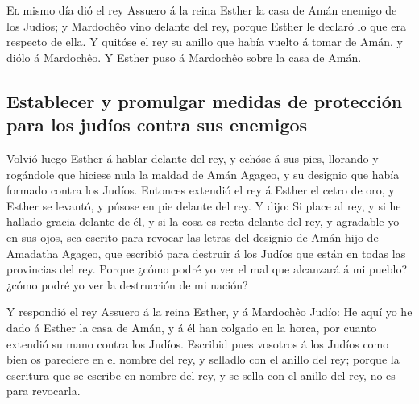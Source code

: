  \textsc{El} mismo día dió el rey Assuero á la reina
Esther la casa de Amán enemigo de los Judíos; y Mardochêo vino delante
del rey, porque Esther le declaró lo que era respecto de ella.
 Y quitóse el rey su anillo que había vuelto á tomar de
Amán, y diólo á Mardochêo. Y Esther puso á Mardochêo sobre la casa de
Amán.

\hypertarget{establecer-y-promulgar-medidas-de-protecciuxf3n-para-los-juduxedos-contra-sus-enemigos}{%
\subsection{Establecer y promulgar medidas de protección para los judíos
contra sus
enemigos}\label{establecer-y-promulgar-medidas-de-protecciuxf3n-para-los-juduxedos-contra-sus-enemigos}}

 Volvió luego Esther á hablar delante del rey, y echóse á
sus pies, llorando y rogándole que hiciese nula la maldad de Amán
Agageo, y su designio que había formado contra los Judíos.
 Entonces extendió el rey á Esther el cetro de oro, y
Esther se levantó, y púsose en pie delante del rey.  Y
dijo: Si place al rey, y si he hallado gracia delante de él, y si la
cosa es recta delante del rey, y agradable yo en sus ojos, sea escrito
para revocar las letras del designio de Amán hijo de Amadatha Agageo,
que escribió para destruir á los Judíos que están en todas las
provincias del rey.  Porque ¿cómo podré yo ver el mal que
alcanzará á mi pueblo? ¿cómo podré yo ver la destrucción de mi nación?

 Y respondió el rey Assuero á la reina Esther, y á
Mardochêo Judío: He aquí yo he dado á Esther la casa de Amán, y á él han
colgado en la horca, por cuanto extendió su mano contra los Judíos.
 Escribid pues vosotros á los Judíos como bien os
pareciere en el nombre del rey, y selladlo con el anillo del rey; porque
la escritura que se escribe en nombre del rey, y se sella con el anillo
del rey, no es para revocarla.

